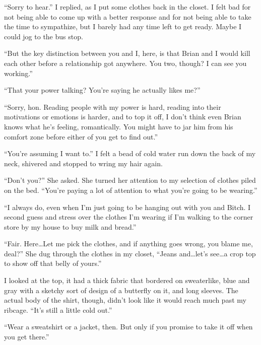 ``Sorry to hear.''  I replied, as I put some clothes back in the closet.  I felt bad for not being able to come up with a better response and for not being able to take the time to sympathize, but I barely had any time left to get ready.  Maybe I could jog to the bus stop.



``But the key distinction between you and I, here, is that Brian and I would kill each other before a relationship got anywhere.  You two, though?  I can see you working.''



``That your power talking?  You're saying he actually likes me?''



``Sorry, hon.  Reading people with my power is hard, reading into their motivations or emotions is harder, and to top it off, I don't think even Brian knows what he's feeling, romantically.  You might have to jar him from his comfort zone before either of you get to find out.''



``You're assuming I want to.''  I felt a bead of cold water run down the back of my neck, shivered and stopped to wring my hair again.



``Don't you?''  She asked.  She turned her attention to my selection of clothes piled on the bed.  ``You're paying a lot of attention to what you're going to be wearing.''



``I always do, even when I'm just going to be hanging out with you and Bitch.  I second guess and stress over the clothes I'm wearing if I'm walking to the corner store by my house to buy milk and bread.''



``Fair.  Here\ldots Let me pick the clothes, and if anything goes wrong, you blame me, deal?'' She dug through the clothes in my closet, ``Jeans and\ldots let's see\ldots a crop top to show off that belly of yours.''



I looked at the top, it had a thick fabric that bordered on sweaterlike, blue and gray with a sketchy sort of design of a butterfly on it, and long sleeves.  The actual body of the shirt, though, didn't look like it would reach much past my ribcage.  ``It's still a little cold out.''



``Wear a sweatshirt or a jacket, then.  But only if you promise to take it off when you get there.''



